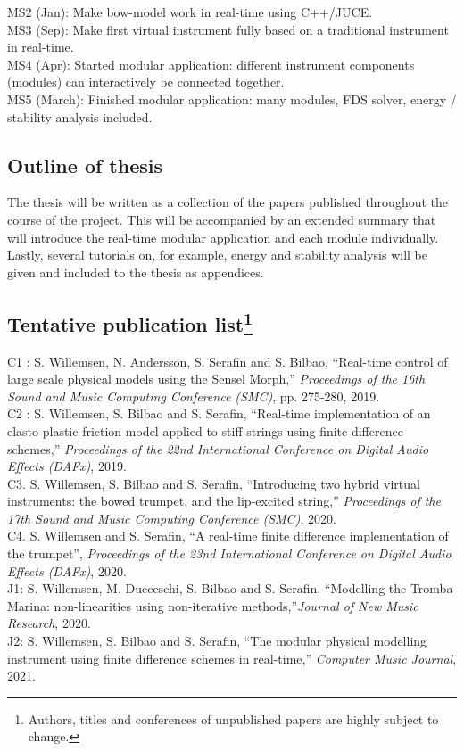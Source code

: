 MS2 (Jan): Make bow-model work in real-time using C++/JUCE.\\
MS3 (Sep): Make first virtual instrument fully based on a traditional instrument in real-time.\\
MS4 (Apr): Started modular application: different instrument components (modules) can interactively be connected together.\\
MS5 (March): Finished modular application: many modules, FDS solver, energy / stability analysis included. 

\subsection{Outline of thesis}
The thesis will be written as a collection of the papers published throughout the course of the project. This will be accompanied by an extended summary that will introduce the real-time modular application and each module individually. Lastly, several tutorials on, for example, energy and stability analysis will be given and included to the thesis as appendices. 

\subsection{Tentative publication list\protect\footnote{Authors, titles and conferences of unpublished papers are highly subject to change.}}
C1 \cite{Willemsen2019a}: S. Willemsen, N. Andersson, S. Serafin and S. Bilbao, ``Real-time control of large scale physical models using the Sensel Morph,'' \textit{Proceedings of the 16th Sound and Music Computing Conference (SMC)}, pp. 275-280, 2019.
\vspace{0.15cm}
\\
C2 \cite{Willemsen2019b}: S. Willemsen, S. Bilbao and S. Serafin, ``Real-time implementation of an elasto-plastic friction model applied to stiff strings using finite difference schemes,'' \textit{Proceedings of the 22nd International Conference on Digital Audio Effects (DAFx)}, 2019.
\vspace{0.15cm}
\\
C3. S. Willemsen, S. Bilbao and S. Serafin, ``Introducing two hybrid virtual instruments: the bowed trumpet, and the lip-excited string,'' \textit{Proceedings of the 17th Sound and Music Computing Conference (SMC)}, 2020.
\vspace{0.15cm}
\\
C4. S. Willemsen and S. Serafin, ``A real-time finite difference implementation of the trumpet'', \textit{Proceedings of the 23nd International Conference on Digital Audio Effects (DAFx)}, 2020.
\vspace{0.15cm}
\\
J1: S. Willemsen, M. Ducceschi, S. Bilbao and S. Serafin, ``Modelling the Tromba Marina: non-linearities using non-iterative methods,''\textit{Journal of New Music Research}, 2020.
\vspace{0.15cm}
\\
J2: S. Willemsen, S. Bilbao and S. Serafin, ``The modular physical modelling instrument using finite difference schemes in real-time,'' \textit{Computer Music Journal}, 2021.

